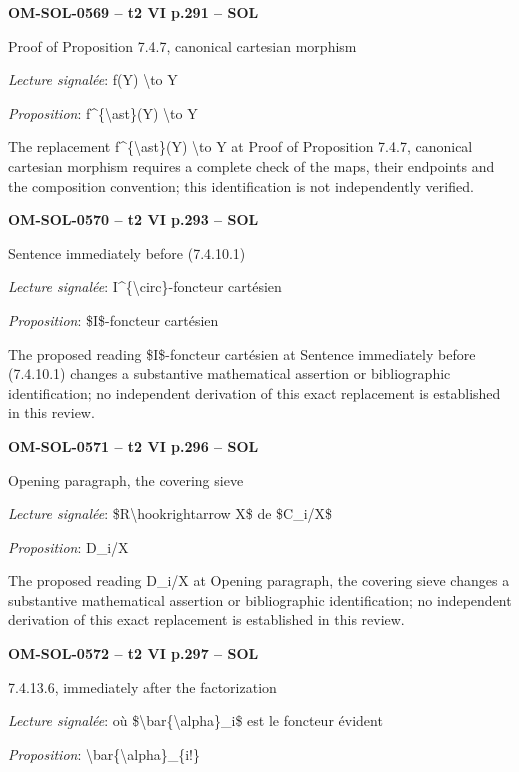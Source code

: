 \par\noindent\textbf{OM-SOL-0569 -- t2 VI p.291 -- SOL}\par
Proof of Proposition 7.4.7, canonical cartesian morphism\par
\emph{Lecture signalée}: f(Y) \textbackslash{}to Y\par
\emph{Proposition}: f\textasciicircum{}\{\textbackslash{}ast\}(Y) \textbackslash{}to Y\par
The replacement f\textasciicircum{}\{\textbackslash{}ast\}(Y) \textbackslash{}to Y at Proof of Proposition 7.4.7, canonical cartesian morphism requires a complete check of the maps, their endpoints and the composition convention; this identification is not independently verified.\par
\par\noindent\textbf{OM-SOL-0570 -- t2 VI p.293 -- SOL}\par
Sentence immediately before (7.4.10.1)\par
\emph{Lecture signalée}: I\textasciicircum{}\{\textbackslash{}circ\}-foncteur cartésien\par
\emph{Proposition}: \$I\$-foncteur cartésien\par
The proposed reading \$I\$-foncteur cartésien at Sentence immediately before (7.4.10.1) changes a substantive mathematical assertion or bibliographic identification; no independent derivation of this exact replacement is established in this review.\par
\par\noindent\textbf{OM-SOL-0571 -- t2 VI p.296 -- SOL}\par
Opening paragraph, the covering sieve\par
\emph{Lecture signalée}: \$R\textbackslash{}hookrightarrow X\$ de \$C\_i/X\$\par
\emph{Proposition}: D\_i/X\par
The proposed reading D\_i/X at Opening paragraph, the covering sieve changes a substantive mathematical assertion or bibliographic identification; no independent derivation of this exact replacement is established in this review.\par
\par\noindent\textbf{OM-SOL-0572 -- t2 VI p.297 -- SOL}\par
7.4.13.6, immediately after the factorization\par
\emph{Lecture signalée}: où \$\textbackslash{}bar\{\textbackslash{}alpha\}\_i\$ est le foncteur évident\par
\emph{Proposition}: \textbackslash{}bar\{\textbackslash{}alpha\}\_\{i!\}\par
